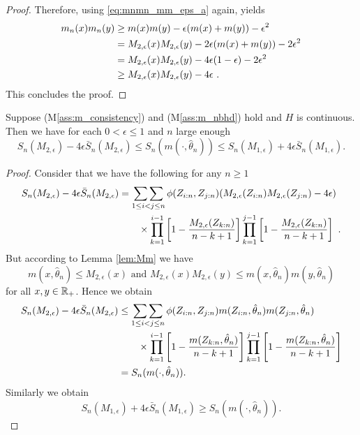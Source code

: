 \begin{lemma}
\begin{proof}
		Therefore, using \eqref{eq:mnmn_mm_eps_a} again, yields
		\begin{align*}
			m_n(x)m_n(y) &\geq m(x)m(y) - \epsilon(m(x) + m(y)) - \epsilon^2\\
			&= M_{2,\epsilon}(x) M_{2,\epsilon}(y) - 2\epsilon(m(x) + m(y)) - 2\epsilon^2\\
			&= M_{2,\epsilon}(x) M_{2,\epsilon}(y) - 4\epsilon(1-\epsilon) - 2\epsilon^2\\
			&\geq M_{2,\epsilon}(x) M_{2,\epsilon}(y) - 4\epsilon \textrm{ .}
		\end{align*}
		This concludes the proof.
	\end{proof}
\end{lemma}

\begin{cor}
	Suppose (M\ref{ass:m_consistency}) and (M\ref{ass:m_nbhd}) hold and $H$ is continuous. Then we have for each $0 < \epsilon \leq 1$ and $n$ large enough
	$$S_n(M_{2,\epsilon}) - 4\epsilon \bar{S}_n(M_{2,\epsilon}) \leq S_n(m(\cdot, \hat\theta_n)) \leq S_n(M_{1,\epsilon}) + 4\epsilon \bar{S}_n(M_{1,\epsilon})\textrm{.}$$
	\label{lem:sandwich}
	\begin{proof}
		Consider that we have the following for any $n\geq 1$
		\begin{align*}
			S_n(M_{2,\epsilon}) - 4\epsilon \bar{S}_n(M_{2,\epsilon}) &= \mathop{\sum\sum}\limits_{1\leq i<j\leq n} \phi(Z_{i:n}, Z_{j:n}) (M_{2,\epsilon}(Z_{i:n}) M_{2,\epsilon}(Z_{j:n}) - 4\epsilon) \\
			&\qquad \times \prod_{k=1}^{i-1}\left[1-\frac{M_{2,\epsilon}(Z_{k:n})}{n-k+1}\right] \prod_{k=1}^{j-1}\left[1-\frac{M_{2,\epsilon}(Z_{k:n})}{n-k+1}\right]\textrm{ .}
		\end{align*}
		But according to Lemma \ref{lem:Mm} we have 
		$$m(x,\hat\theta_n) \leq M_{2,\epsilon}(x) \textrm{ and } M_{2,\epsilon}(x)M_{2,\epsilon}(y) \leq m(x,\hat\theta_n)m(y,\hat\theta_n)$$
		for all $x,y \in \mathbb{R}_+$. Hence we obtain
		\begin{align*}
		S_n(M_{2,\epsilon}) - 4\epsilon \bar{S}_n(M_{2,\epsilon}) &\leq \mathop{\sum\sum}\limits_{1\leq i<j\leq n} \phi(Z_{i:n}, Z_{j:n}) m(Z_{i:n},\hat\theta_n)m(Z_{j:n},\hat\theta_n) \\
		&\qquad \times \prod_{k=1}^{i-1}\left[1-\frac{m(Z_{k:n},\hat\theta_n)}{n-k+1}\right] \prod_{k=1}^{j-1}\left[1-\frac{m(Z_{k:n},\hat\theta_n)}{n-k+1}\right]\\
		&= S_n(m(\cdot, \hat\theta_n))\textrm{.}
		\end{align*}
		Similarly we obtain 
		$$S_n(M_{1,\epsilon}) + 4\epsilon \bar{S}_n(M_{1,\epsilon}) \geq S_n(m(\cdot, \hat\theta_n)) \textrm{.}$$
	\end{proof}
\end{cor}

